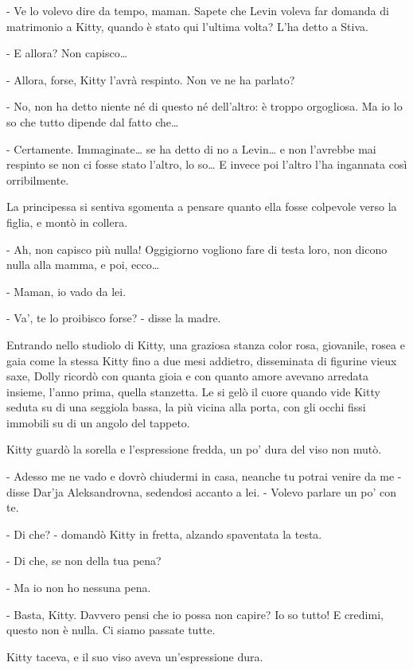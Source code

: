 - Ve lo volevo dire da tempo, maman. Sapete che Levin voleva far domanda di matrimonio a Kitty, quando è stato qui l'ultima volta? L'ha detto a Stiva. 

- E allora? Non capisco\ldots{} 

- Allora, forse, Kitty l'avrà respinto. Non ve ne ha parlato? 

- No, non ha detto niente né di questo né dell'altro: è troppo orgogliosa. Ma io lo so che tutto dipende dal fatto che\ldots{} 

- Certamente. Immaginate\ldots{} se ha detto di no a Levin\ldots{} e non l'avrebbe mai respinto se non ci fosse stato l'altro, lo so\ldots{} E invece poi l'altro l'ha ingannata così orribilmente. 

La principessa si sentiva sgomenta a pensare quanto ella fosse colpevole verso la figlia, e montò in collera. 

- Ah, non capisco più nulla! Oggigiorno vogliono fare di testa loro, non dicono nulla alla mamma, e poi, ecco\ldots{} 

- Maman, io vado da lei. 

- Va', te lo proibisco forse? - disse la madre. 

\label{iii-1} 

Entrando nello studiolo di Kitty, una graziosa stanza color rosa, giovanile, rosea e gaia come la stessa Kitty fino a due mesi addietro, disseminata di figurine vieux saxe, Dolly ricordò con quanta gioia e con quanto amore avevano arredata insieme, l'anno prima, quella stanzetta. Le si gelò il cuore quando vide Kitty seduta su di una seggiola bassa, la più vicina alla porta, con gli occhi fissi immobili su di un angolo del tappeto. 

Kitty guardò la sorella e l'espressione fredda, un po' dura del viso non mutò. 

- Adesso me ne vado e dovrò chiudermi in casa, neanche tu potrai venire da me - disse Dar'ja Aleksandrovna, sedendosi accanto a lei. - Volevo parlare un po' con te. 

- Di che? - domandò Kitty in fretta, alzando spaventata la testa. 

- Di che, se non della tua pena? 

- Ma io non ho nessuna pena. 

- Basta, Kitty. Davvero pensi che io possa non capire? Io so tutto! E credimi, questo non è nulla. Ci siamo passate tutte. 

Kitty taceva, e il suo viso aveva un'espressione dura. 

